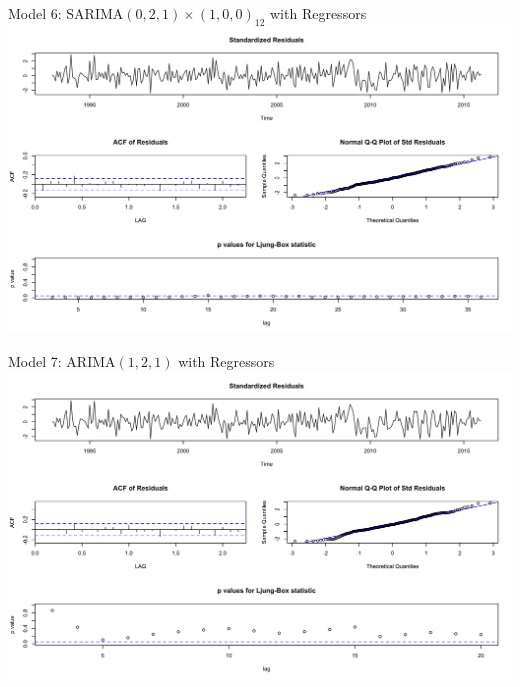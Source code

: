   \begin{frame}{Model 6: SARIMA\((0,2,1) \times (1,0,0)_{12}\) with Regressors}
  		\includegraphics[width=\linewidth]{images/seasonallyadjustedmodel6}
  \end{frame}
  
  
  \begin{frame}{Model 7: ARIMA\((1,2,1)\) with Regressors}
  		\includegraphics[width=\linewidth]{images/seasonallyadjustedmodel7}
  \end{frame}  
  
  

  

